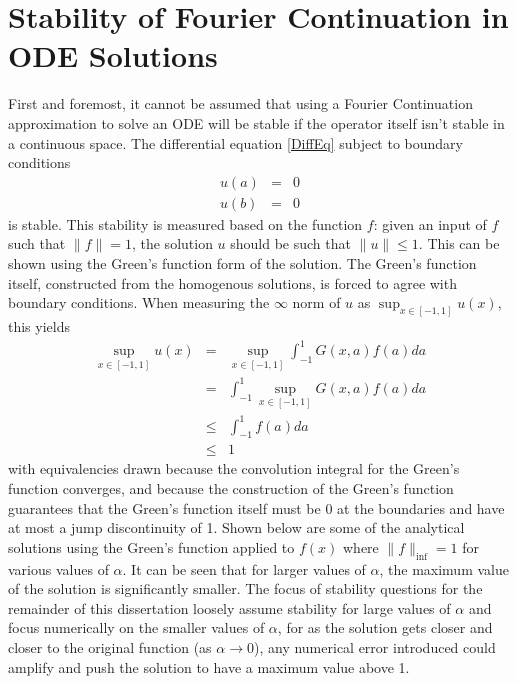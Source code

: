 \documentclass[11pt]{amsart}
\begin{document}
\section{Stability of Fourier Continuation in ODE Solutions}
First and foremost, it cannot be assumed that using a Fourier Continuation approximation to solve an ODE will be stable if the operator itself isn't stable in a continuous space.  The differential equation \ref{DiffEq} subject to boundary conditions 
\begin{eqnarray*}
u(a)&=&0 \\ 
u(b)&=&0
\end{eqnarray*}
is stable.  This stability is measured based on the function $f$: given an input of $f$ such that $\|f\|=1$, the solution $u$ should be such that $\|u\| \leq 1$.  This can be shown using the Green's function form of the solution.   The Green's function itself, constructed from the homogenous solutions, is forced to agree with boundary conditions.  When measuring the $\infty$ norm of $u$ as $\sup_{x \in [-1,1]} u(x)$, this yields
\begin{eqnarray*}
\sup_{x \in [-1,1]} u(x) &=& \sup_{x \in [-1,1] } \int_{-1}^{1}G(x,a)f(a)da \\
 &=& \int_{-1}^{1} \sup_{x \in [-1,1]} G(x,a)f(a)da \\ 
 &\leq& \int_{-1}^{1} f(a)da \\
 &\leq & 1 
\end{eqnarray*}
with equivalencies drawn because the convolution integral for the Green's function converges, and because the construction of the Green's function guarantees that the Green's function itself must be 0 at the boundaries  and have at most a jump discontinuity of 1.  
Shown below are some of the analytical solutions using the Green's function applied to $f(x)$ where $\|f\|_{\inf}=1$ for various values of $\alpha$. It can be seen that for larger values of $\alpha$, the maximum value of the solution is significantly smaller. The focus of stability questions for the remainder of this dissertation loosely assume stability for large values of $\alpha$ and focus numerically on the smaller values of $\alpha$, for as the solution gets closer and closer to the original function (as $\alpha \to 0$), any numerical error introduced could amplify and push the solution to have a maximum value above 1.  
\end{document}
